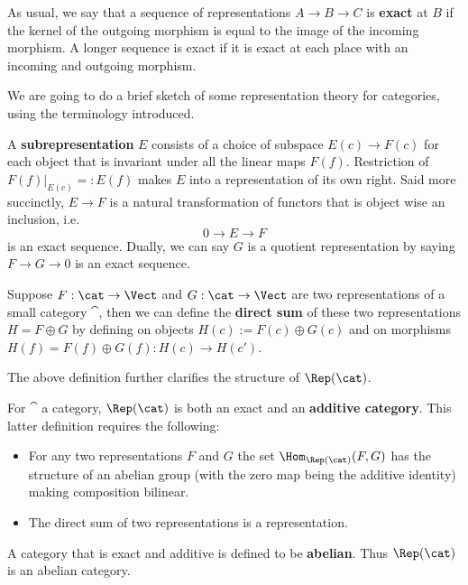 As usual, we say that a sequence of representations $A\to B \to C$ is \textbf{exact} at $B$ if the kernel of the outgoing morphism is equal to the image of the incoming morphism. A longer sequence is exact if it is exact at each place with an incoming and outgoing morphism.

We are going to do a brief sketch of some representation theory for categories, using the terminology introduced.

\begin{defn}
	A \textbf{subrepresentation} $E$ consists of a choice of subspace $E(c)\to F(c)$ for each object that is invariant under all the linear maps $F(f)$. Restriction of $F(f)|_{E(c)}=:E(f)$ makes $E$ into a representation of its own right. Said more succinctly, $E\to F$ is a natural transformation of functors that is object wise an inclusion, i.e.
	\[
		0 \to E \to F
	\] 
is an exact sequence. Dually, we can say $G$ is a quotient representation by saying $F\to G \to 0$ is an exact sequence.
\end{defn}

\begin{defn}
	Suppose $F:\cat\to\Vect$ and $G:\cat\to\Vect$ are two representations of a small category $\cat$, then we can define the \textbf{direct sum} of these two representations $H=F\oplus G$ by defining on objects $H(c):=F(c)\oplus G(c)$ and on morphisms $H(f)=F(f)\oplus G(f):H(c)\to H(c')$.
\end{defn}

The above definition further clarifies the structure of $\Rep(\cat)$.

\begin{clm}
	For $\cat$ a category, $\Rep(\cat)$ is both an exact and an \textbf{additive category}. This latter definition requires the following:
	\begin{itemize}
		\item For any two representations $F$ and $G$ the set $\Hom_{\Rep(\cat)}(F,G)$ has the structure of an abelian group (with the zero map being the additive identity) making composition bilinear.
		\item The direct sum of two representations is a representation.
	\end{itemize}
	A category that is exact and additive is defined to be \textbf{abelian}. Thus $\Rep(\cat)$ is an abelian category. 
\end{clm}

